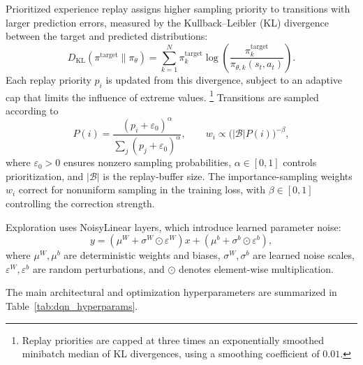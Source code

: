 \documentclass[11pt,a4paper]{article}
\begin{document}
Prioritized experience replay assigns higher sampling
priority to transitions with larger prediction errors,
measured by the Kullback--Leibler (KL) divergence
between the target and predicted distributions:
\begin{equation}
  D_{\mathrm{KL}}(\pi^{\mathrm{target}}\|\pi_\theta)
  =
  \sum_{k=1}^{N}
  \pi_k^{\mathrm{target}}
  \log\left(
    \frac{\pi_k^{\mathrm{target}}}
         {\pi_{\theta,k}(s_t,a_t)}
  \right).
\end{equation}
Each replay priority $p_i$ is updated from this
divergence, subject to an adaptive cap that limits
the influence of extreme values.
\footnote{Replay priorities are capped at three times an
exponentially smoothed minibatch median of KL divergences,
using a smoothing coefficient of $0.01$.}
Transitions are sampled according to
\begin{equation}
  P(i)=
  \frac{(p_i+\varepsilon_0)^\alpha}
       {\sum_j(p_j+\varepsilon_0)^\alpha},
  \qquad
  w_i\propto\bigl(|\mathcal B|P(i)\bigr)^{-\beta},
\end{equation}
where $\varepsilon_0>0$ ensures nonzero sampling
probabilities, $\alpha\in[0,1]$ controls prioritization,
and $|\mathcal B|$ is the replay-buffer size.
The importance-sampling weights $w_i$ correct for
nonuniform sampling in the training loss, with
$\beta\in[0,1]$ controlling the correction strength.

Exploration uses NoisyLinear layers, which introduce
learned parameter noise:
\begin{equation}
  y=
  (\mu^W+\sigma^W\odot\varepsilon^W)x
  +
  (\mu^b+\sigma^b\odot\varepsilon^b),
\end{equation}
where $\mu^W,\mu^b$ are deterministic weights and biases,
$\sigma^W,\sigma^b$ are learned noise scales,
$\varepsilon^W,\varepsilon^b$ are random perturbations,
and $\odot$ denotes element-wise multiplication.

The main architectural and optimization hyperparameters
are summarized in Table~\ref{tab:dqn_hyperparams}.
\end{document}
